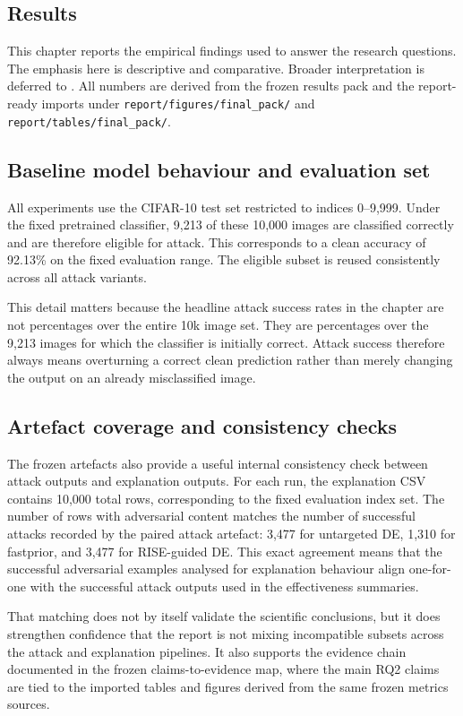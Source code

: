 \subsection{Results}
\label{sec:results}

This chapter reports the empirical findings used to answer the research questions.
The emphasis here is descriptive and comparative.
Broader interpretation is deferred to .
All numbers are derived from the frozen results pack and the report-ready imports under \texttt{report/figures/final\_pack/} and \texttt{report/tables/final\_pack/}.

\subsection{Baseline model behaviour and evaluation set}
All experiments use the CIFAR-10 test set restricted to indices 0--9{,}999.
Under the fixed pretrained classifier, 9{,}213 of these 10{,}000 images are classified correctly and are therefore eligible for attack.
This corresponds to a clean accuracy of 92.13\% on the fixed evaluation range.
The eligible subset is reused consistently across all attack variants.

This detail matters because the headline attack success rates in the chapter are not percentages over the entire 10k image set.
They are percentages over the 9{,}213 images for which the classifier is initially correct.
Attack success therefore always means overturning a correct clean prediction rather than merely changing the output on an already misclassified image.

\subsection{Artefact coverage and consistency checks}
The frozen artefacts also provide a useful internal consistency check between attack outputs and explanation outputs.
For each run, the explanation CSV contains 10{,}000 total rows, corresponding to the fixed evaluation index set.
The number of rows with adversarial content matches the number of successful attacks recorded by the paired attack artefact:
3{,}477 for untargeted DE, 1{,}310 for fastprior, and 3{,}477 for RISE-guided DE.
This exact agreement means that the successful adversarial examples analysed for explanation behaviour align one-for-one with the successful attack outputs used in the effectiveness summaries.

That matching does not by itself validate the scientific conclusions, but it does strengthen confidence that the report is not mixing incompatible subsets across the attack and explanation pipelines.
It also supports the evidence chain documented in the frozen claims-to-evidence map, where the main RQ2 claims are tied to the imported tables and figures derived from the same frozen metrics sources.

